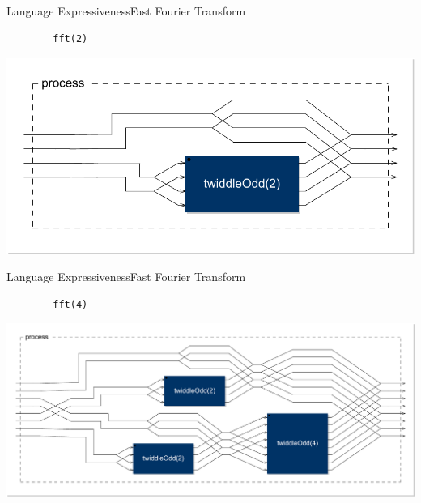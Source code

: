     
\begin{frame}[fragile,shrink=30]{Language Expressiveness}{Fast Fourier Transform}
    \vspace{1cm}
    \begin{lstlisting}
        fft(2)
    \end{lstlisting}

    \begin{center}
        \includegraphics[width=1\textwidth]{images/fft2}
    \end{center}
\end{frame}
    
\begin{frame}[fragile,shrink=30]{Language Expressiveness}{Fast Fourier Transform}
    \vspace{1cm}
    \begin{lstlisting}
        fft(4)
    \end{lstlisting}

    \begin{center}
        \includegraphics[width=1\textwidth]{images/fft4}
    \end{center}
\end{frame}
    
